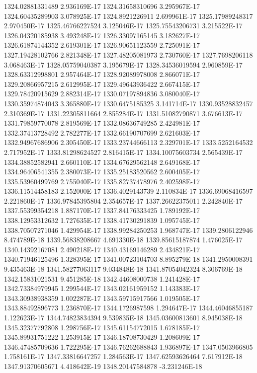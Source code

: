 1324.02881331489  2.936169E-17
1324.31658310696  3.295967E-17
1324.60435289903  3.078925E-17
1324.8921226911  2.699961E-17
1325.17989248317  2.970450E-17
1325.46766227524  3.125046E-17
1325.75543206731  3.215522E-17
1326.04320185938  3.493248E-17
1326.33097165145  3.182627E-17
1326.61874144352  2.619301E-17
1326.90651123559  2.725091E-17
1327.19428102766  2.821348E-17
1327.48205081973  2.730760E-17
1327.7698206118  3.068463E-17
1328.05759040387  3.195679E-17
1328.34536019594  2.960859E-17
1328.63312998801  2.957464E-17
1328.92089978008  2.866071E-17
1329.20866957215  2.612995E-17
1329.49643936422  2.667415E-17
1329.78420915629  2.882314E-17
1330.07197894836  3.080040E-17
1330.35974874043  3.365880E-17
1330.6475185325  3.141714E-17
1330.93528832457  2.310369E-17
1331.22305811664  2.855284E-17
1331.51082790871  3.676613E-17
1331.79859770078  2.819569E-17
1332.08636749285  2.424981E-17
1332.37413728492  2.782277E-17
1332.66190707699  2.621603E-17
1332.94967686906  2.305450E-17
1333.23744666113  2.329701E-17
1333.5252164532  2.717952E-17
1333.81298624527  2.816415E-17
1334.10075603734  2.565439E-17
1334.38852582941  2.660110E-17
1334.67629562148  2.649168E-17
1334.96406541355  2.380073E-17
1335.25183520562  2.600405E-17
1335.53960499769  2.755040E-17
1335.82737478976  2.402598E-17
1336.11514458183  2.152000E-17
1336.4029143739  2.110834E-17
1336.69068416597  2.221860E-17
1336.97845395804  2.354657E-17
1337.26622375011  2.242840E-17
1337.55399354218  1.887170E-17
1337.84176333425  1.789192E-17
1338.12953312632  1.727635E-17
1338.41730291839  1.095745E-17
1338.70507271046  1.429954E-17
1338.99284250253  1.968747E-17
1339.2806122946  8.474789E-18
1339.56838208667  4.691330E-18
1339.85615187874  1.476025E-17
1340.14392167081  2.490218E-17
1340.43169146289  2.434821E-17
1340.71946125496  1.328395E-17
1341.00723104703  8.895279E-18
1341.2950008391  9.435463E-18
1341.58277063117  9.034848E-18
1341.87054042324  8.306769E-18
1342.15831021531  9.451285E-18
1342.44608000738  1.241428E-17
1342.73384979945  1.299544E-17
1343.02161959152  1.143383E-17
1343.30938938359  1.002287E-17
1343.59715917566  1.019505E-17
1343.88492896773  1.236870E-17
1344.1726987598  1.294647E-17
1344.46046855187  1.122623E-17
1344.74823834394  9.539835E-18
1345.03600813601  8.945038E-18
1345.32377792808  1.298756E-17
1345.61154772015  1.678185E-17
1345.89931751222  1.253915E-17
1346.18708730429  1.208609E-17
1346.47485709636  1.722295E-17
1346.76262688843  1.936897E-17
1347.0503966805  1.758161E-17
1347.33816647257  1.284563E-17
1347.62593626464  7.617912E-18
1347.91370605671  4.418642E-19
1348.20147584878  -3.231246E-18
